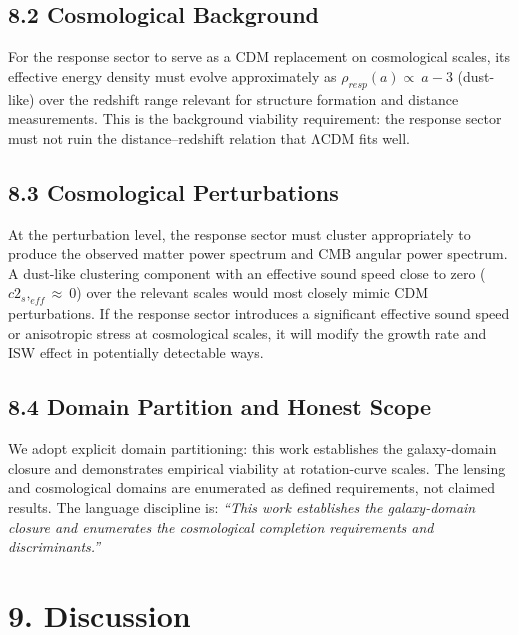 \subsection{8.2 Cosmological Background}\label{cosmological-background}

For the response sector to serve as a CDM replacement on cosmological scales, its effective energy density must evolve approximately as \(\rho_{resp}(a) \propto \ a - 3\) (dust-like) over the redshift range relevant for structure formation and distance measurements. This is the background viability requirement: the response sector must not ruin the distance--redshift relation that ΛCDM fits well.

\subsection{8.3 Cosmological Perturbations}\label{cosmological-perturbations}

At the perturbation level, the response sector must cluster appropriately to produce the observed matter power spectrum and CMB angular power spectrum. A dust-like clustering component with an effective sound speed close to zero (\(c2_{s},_{eff} \approx \ 0\)) over the relevant scales would most closely mimic CDM perturbations. If the response sector introduces a significant effective sound speed or anisotropic stress at cosmological scales, it will modify the growth rate and ISW effect in potentially detectable ways.

\subsection{8.4 Domain Partition and Honest Scope}\label{domain-partition-and-honest-scope}

We adopt explicit domain partitioning: this work establishes the galaxy-domain closure and demonstrates empirical viability at rotation-curve scales. The lensing and cosmological domains are enumerated as defined requirements, not claimed results. The language discipline is: \emph{``This work establishes the galaxy-domain closure and enumerates the cosmological completion requirements and discriminants.''}

\section{}\label{section-9}

\section{9. Discussion}\label{discussion}

